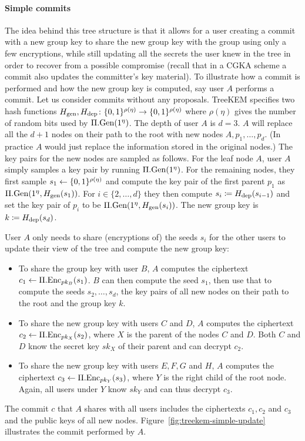 \paragraph{Simple commits} \label{sec:simple-commit} The idea behind this tree structure is that it allows for a user creating a commit with a new group key to share the new group key with the group using only a few encryptions, while still updating all the secrets the user knew in the tree in order to recover from a possible compromise (recall that in a CGKA scheme a commit also updates the committer's key material).
To illustrate how a commit is performed and how the new group key is computed, say user $A$ performs a commit. Let us consider commits without any proposals. TreeKEM specifies two hash functions $H_\mathrm{gen}, H_\mathrm{dep} \colon \{0, 1\}^{\rho(\eta)} \to \{0, 1\}^{\rho(\eta)}$ where $\rho(\eta)$ gives the number of random bits used by $\Pi.\mathrm{Gen}(1^\eta)$. The depth of user $A$ is $d = 3$. $A$ will replace all the $d + 1$ nodes on their path to the root with new nodes $A, p_1, \ldots, p_d$. (In practice $A$ would just replace the information stored in the original nodes.)
The key pairs for the new nodes are sampled as follows. For the leaf node $A$, user $A$ simply samples a key pair by running $\Pi.\mathrm{Gen}(1^\eta)$. For the remaining nodes, they first sample $s_1 \leftarrow \{0, 1\}^{\rho(\eta)}$ and compute the key pair of the first parent $p_1$ as $\Pi.\mathrm{Gen}(1^\eta, H_\mathrm{gen}(s_1))$. For $i \in \{2, \ldots, d\}$ they then compute $s_i \coloneqq H_\mathrm{dep}(s_{i - 1})$ and set the key pair of $p_i$ to be $\Pi.\mathrm{Gen}(1^\eta, H_\mathrm{gen}(s_i))$. The new group key is $k \coloneqq H_\mathrm{dep}(s_{d})$.

User $A$ only needs to share (encryptions of) the seeds $s_i$ for the other users to update their view of the tree and compute the new group key:
\begin{itemize}
	\item To share the group key with user $B$, $A$ computes the ciphertext $c_1 \leftarrow \Pi.\mathrm{Enc}_{pk_B}(s_1)$. $B$ can then compute the seed $s_1$, then use that to compute the seeds $s_2, \ldots, s_d$, the key pairs of all new nodes on their path to the root and the group key $k$.
	\item To share the new group key with users $C$ and $D$, $A$ computes the ciphertext $c_2 \leftarrow \Pi.\mathrm{Enc}_{pk_X}(s_2)$, where $X$ is the parent of the nodes $C$ and $D$. Both $C$ and $D$ know the secret key $sk_X$ of their parent and can decrypt $c_2$.
	\item To share the new group key with users $E, F, G$ and $H$, $A$ computes the ciphertext $c_3 \leftarrow \Pi.\mathrm{Enc}_{pk_Y}(s_3)$, where $Y$ is the right child of the root node. Again, all users under $Y$ know $sk_Y$ and can thus decrypt $c_3$.
\end{itemize}
The commit $c$ that $A$ shares with all users includes the ciphertexts $c_1, c_2$ and $c_3$ and the public keys of all new nodes. Figure~\ref{fig:treekem-simple-update} illustrates the commit performed by $A$.

